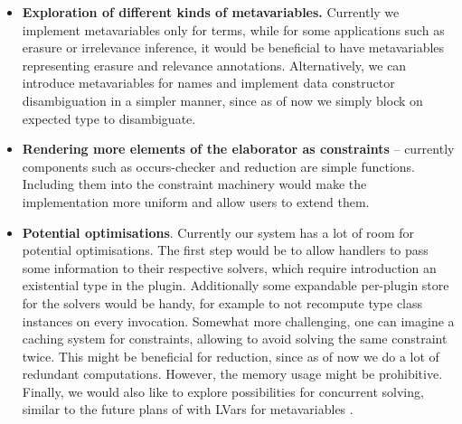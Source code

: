 \documentclass[
  sigconf,
  screen,
  review]{acmart}
\providecommand{\tightlist}{%
  \setlength{\itemsep}{0pt}\setlength{\parskip}{0pt}}
\newlength{\cslhangindent}
\newlength{\cslentryspacingunit} %
\newenvironment{CSLReferences}[2] %
 {%
  \setlength{\parindent}{0pt}
  \ifodd #1
  \let\oldpar\par
  \def\par{\hangindent=\cslhangindent\oldpar}
  \fi
  \setlength{\parskip}{#2\cslentryspacingunit}
 }%
 {}
\begin{document}
\begin{itemize}
\tightlist
\item
  \textbf{Exploration of different kinds of metavariables.} Currently we
  implement metavariables only for terms, while for some applications
  such as erasure \citep{tejiscakDependentlyTypedCalculus2020} or
  irrelevance inference, it would be beneficial to have metavariables
  representing erasure and relevance annotations. Alternatively, we can
  introduce metavariables for names and implement data constructor
  disambiguation in a simpler manner, since as of now we simply block on
  expected type to disambiguate.
\item
  \textbf{Rendering more elements of the elaborator as constraints} --
  currently components such as occurs-checker and reduction are simple
  functions. Including them into the constraint machinery would make the
  implementation more uniform and allow users to extend them.
\item
  \textbf{Potential optimisations}. Currently our system has a lot of
  room for potential optimisations. The first step would be to allow
  handlers to pass some information to their respective solvers, which
  require introduction an existential type in the plugin. Additionally
  some expandable per-plugin store for the solvers would be handy, for
  example to not recompute type class instances on every invocation.
  Somewhat more challenging, one can imagine a caching system for
  constraints, allowing to avoid solving the same constraint twice. This
  might be beneficial for reduction, since as of now we do a lot of
  redundant computations. However, the memory usage might be
  prohibitive. Finally, we would also like to explore possibilities for
  concurrent solving, similar to the future plans of
  \citet{allaisTypOSOperatingSystem2022a} with LVars for metavariables
  \citep{kuperLatticebasedDataStructures2015}.
\end{itemize}

\hypertarget{refs}{}
\begin{CSLReferences}{0}{0}
\end{CSLReferences}

  
  
\end{document}
